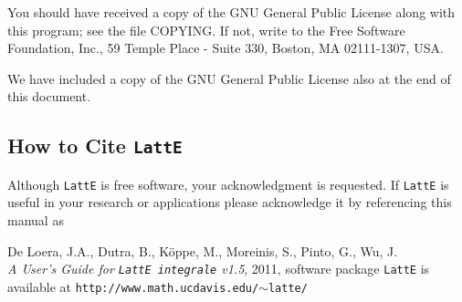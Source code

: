 \documentclass{article}
\newcommand{\latte}{{\tt LattE}\xspace}
\newcommand{\latteV}{v1.5}
\begin{document}
You should have received a copy of the GNU General Public License
along with this program; see the file COPYING. If not, write to
the Free Software Foundation, Inc., 59 Temple Place - Suite 330,
Boston, MA 02111-1307, USA.

We have included a copy of the GNU General Public License also at the
end of this document.

\subsection{How to Cite {\tt LattE}}

Although {\tt LattE} is free software, your acknowledgment
is requested.  If {\tt LattE} is useful in your research or
applications please acknowledge it by referencing this manual as

De Loera, J.A., Dutra, B., K\"oppe, M., Moreinis, S.,
Pinto, G., Wu, J.\\ 
{\em A User's Guide for {\tt LattE integrale} \latteV}, 2011, 
software package \latte is available at 
{\tt http://www.math.ucdavis.edu/$\sim$latte/}
	
\end{document}
